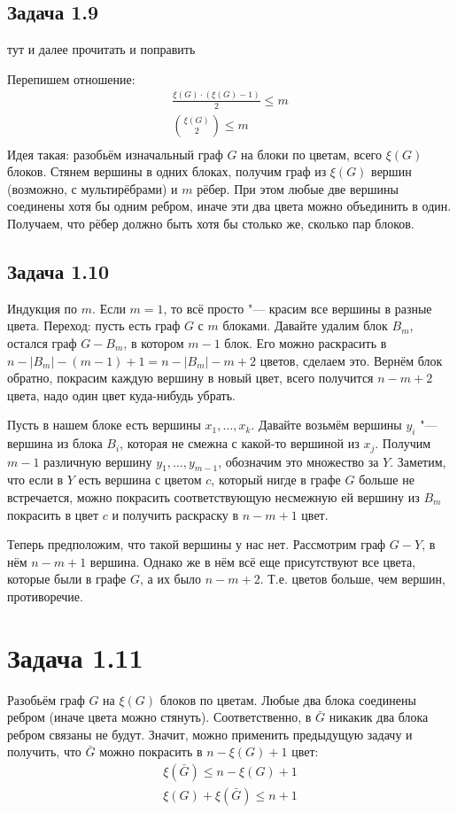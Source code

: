 \subsection{Задача 1.9}
	\TODO тут и далее прочитать и поправить

	Перепишем отношение:
	\begin{gather*}
		\frac{\xi(G)\cdot(\xi(G) - 1)}{2} \le m \\
		\binom{\xi(G)}{2} \le m \\
	\end{gather*}
	Идея такая: разобьём изначальный граф $G$ на блоки по цветам, всего $\xi(G)$ блоков.
	Стянем вершины в одних блоках, получим граф из $\xi(G)$ вершин (возможно, с мультирёбрами)
	и $m$ рёбер.
	При этом любые две вершины соединены хотя бы одним ребром, иначе эти два цвета можно объединить в один.
	Получаем, что рёбер должно быть хотя бы столько же, сколько пар блоков.

\subsection{Задача 1.10}
	Индукция по $m$.
	Если $m=1$, то всё просто "--- красим все вершины в разные цвета.
	Переход: пусть есть граф $G$ с $m$ блоками.
	Давайте удалим блок $B_m$, остался граф $G-B_m$, в котором $m-1$ блок.
	Его можно раскрасить в $n-|B_m|-(m-1)+1=n-|B_m|-m+2$ цветов, сделаем это.
	Вернём блок обратно, покрасим каждую вершину в новый цвет, всего получится $n-m+2$ цвета,
	надо один цвет куда-нибудь убрать.
	
	Пусть в нашем блоке есть вершины $x_1, \dots, x_k$.
	Давайте возьмём вершины $y_i$ "--- вершина из блока $B_i$, которая не смежна с какой-то вершиной из $x_j$.
	Получим $m-1$ различную вершину $y_1, \dots, y_{m-1}$, обозначим это множество за $Y$.
	Заметим, что если в $Y$ есть вершина с цветом $c$, который нигде в графе $G$ больше не встречается,
	можно покрасить соответствующую несмежную ей вершину из $B_m$ покрасить в цвет $c$ и получить раскраску в $n-m+1$ цвет.

	Теперь предположим, что такой вершины у нас нет.
	Рассмотрим граф $G-Y$, в нём $n-m+1$ вершина.
	Однако же в нём всё еще присутствуют все цвета, которые были в графе $G$, а их было $n-m+2$.
	Т.е. цветов больше, чем вершин, противоречие.

\section{Задача 1.11}
	Разобьём граф $G$ на $\xi(G)$ блоков по цветам.
	Любые два блока соединены ребром (иначе цвета можно стянуть).
	Соответственно, в $\bar G$ никакик два блока ребром связаны не будут.
	Значит, можно применить предыдущую задачу и получить, что $\bar G$ можно покрасить
	в $n - \xi(G) + 1$ цвет:
	\begin{gather*}
		\xi(\bar G) \le n - \xi(G) + 1 \\
		\xi(G) + \xi(\bar G) \le n + 1
	\end{gather*}

